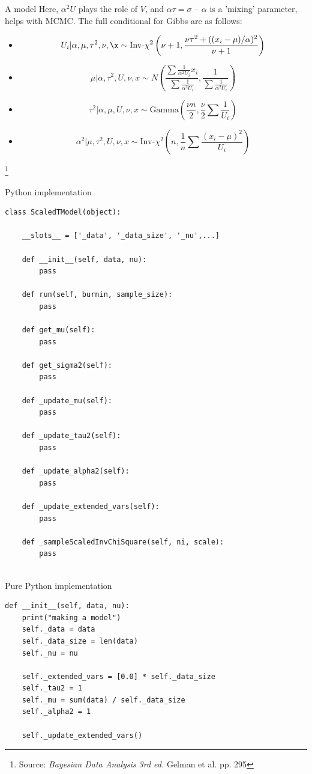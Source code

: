 \documentclass[8pt]{beamer}
\newcommand\blfootnote[1]{%
	\begingroup
	\renewcommand\thefootnote{}\footnote{#1}%
	\addtocounter{footnote}{-1}%
	\endgroup
}
\begin{document}
\begin{frame}{A model}
Here, $\alpha^2U$ plays the role of $V$, and $\alpha\tau=\sigma$ -- $\alpha$ is a 'mixing' parameter, helps with MCMC.
The full conditional for Gibbs are as follows:
\begin{itemize}
	\item<3->\[ U_i| \alpha, \mu, \tau^2, \nu, \x \sim \text{Inv-}\chi^2\left(\nu+1, \frac{\nu\tau^2+ ((x_i-\mu)/\alpha)^2}{\nu+1}\right) \]
	\item<4->\[\mu|\alpha, \tau^2, U, \nu, x \sim N\left(\frac{\sum\frac{1}{\alpha^2U_i}x_i}{\sum\frac{1}{\alpha^2U_i}}, \frac{1}{\sum\frac{1}{\alpha^2U_i}} \right) \]
	\item<5->\[\tau^2 | \alpha, \mu, U, \nu, x \sim \text{Gamma}\left(\frac{\nu n}{2}, \frac{\nu}{2}\sum\frac{1}{U_i}\right)\]
	\item<6->\[\alpha^2| \mu, \tau^2, U, \nu, x \sim \text{Inv-}\chi^2\left(n, \frac{1}{n}\sum\frac{(x_i-\mu)^2}{U_i}\right)\]
\end{itemize}
\blfootnote{Source: \emph{Bayesian Data Analysis 3rd ed.} Gelman et al. pp. 295}
\end{frame}

\begin{frame}[fragile]{Python implementation}
\begin{verbatim}
class ScaledTModel(object):

	__slots__ = ['_data', '_data_size', '_nu',...] 

	def __init__(self, data, nu):
		pass
		
	def run(self, burnin, sample_size):
		pass
		
	def get_mu(self):
		pass
		
	def get_sigma2(self):
		pass
		
	def _update_mu(self):
		pass
	
	def _update_tau2(self):
		pass
	
	def _update_alpha2(self):
		pass
	
	def _update_extended_vars(self):
		pass
		
	def _sampleScaledInvChiSquare(self, ni, scale):
		pass
	
\end{verbatim}
\end{frame}

\begin{frame}[fragile]{Pure Python implementation}
\begin{verbatim}
def __init__(self, data, nu):
	print("making a model")
	self._data = data
	self._data_size = len(data)
	self._nu = nu

	self._extended_vars = [0.0] * self._data_size
	self._tau2 = 1
	self._mu = sum(data) / self._data_size
	self._alpha2 = 1

	self._update_extended_vars()
\end{verbatim}
\end{frame}
\end{document}
